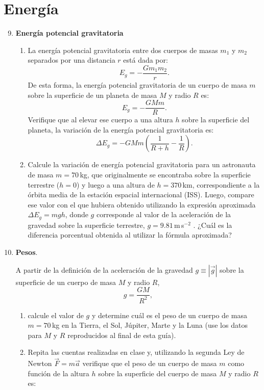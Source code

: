 \documentclass[a4paper,12pt]{article}
\begin{document}
\section*{Energía}

\begin{enumerate}
  \setcounter{enumi}{8}

\item {\bf{Energía potencial gravitatoria}}

\begin{enumerate}
\item La energía potencial gravitatoria entre dos cuerpos de masas $m_1$ y $m_2$
separados por una distancia $r$ está dada por: 
\[
E_g = -\frac{G m_1 m_2}{r}.
\]
De esta forma, la energía potencial gravitatoria de un cuerpo de masa $m$ sobre
la superficie de un planeta de masa $M$ y radio $R$ es: 
\[
E_g = -\frac{G M m}{R}.
\]
Verifique que al elevar ese cuerpo a una altura $h$ sobre la superficie del
planeta, la variación de la energía potencial gravitatoria es: 
\[
\Delta E_g = - G M m \left ( \frac{1}{R+h} - \frac{1}{R} \right ).
\]
\item Calcule la variación de energía potencial gravitatoria para un astronauta de masa $m=70$\,kg, que originalmente se encontraba sobre la superficie terrestre ($h=0$) y luego a una altura de $h=370$\,km, correspondiente a la órbita media de la estación espacial internacional (ISS). Luego, compare ese valor con el que hubiera obtenido utilizando la expresión aproximada $\Delta E_g = m g h$, donde $g$ corresponde al valor de la aceleración de la gravedad sobre la superficie terrestre, $g=9.81$\,m\,s$^{-2}$ . ¿Cuál es la diferencia porcentual obtenida al utilizar la fórmula aproximada?
\end{enumerate} 

\item {\bf{Pesos}}.

A partir de la definición de la aceleración de la gravedad $g\equiv |\vec g|$ sobre la superficie de un cuerpo de masa $M$ y radio $R$, 
\[ g=\frac{GM}{R^2}, \]
\begin{enumerate}
  \item calcule el valor de $g$ y determine cuál es el peso de un cuerpo de masa $m=70$\,kg en la Tierra, el Sol, Júpiter, Marte y la Luna (use los datos para $M$ y $R$ reproducidos al final de esta guía).
  \item Repita las cuentas realizadas en clase y, utilizando la segunda Ley de Newton $\vec F=m \vec a$ verifique que el peso de un cuerpo de masa $m$ como función de la altura $h$ sobre la superficie del cuerpo de masa $M$ y radio $R$ es: 
    

\end{enumerate}
\end{enumerate}
\end{document}
